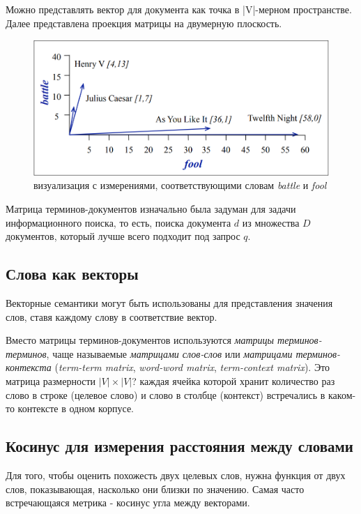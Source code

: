 \documentclass[a4paper,12pt,preview]{report} %
\begin{document}
	Можно представлять вектор для документа как точка в |V|-мерном пространстве. Далее представлена проекция матрицы на  двумерную плоскость.
	
	\begin{figure}[H]
		\centering\includegraphics[scale=0.6]{proje.PNG}
		\caption{визуализация с измерениями, соответствующими словам \textit{battle} и \textit{fool}}
		\label{fig:proje}
	\end{figure}
	
	Матрица терминов-документов изначально была задуман для задачи информационного поиска, то есть, поиска документа $d$ из множества $D$ документов, который лучше всего подходит под запрос $q$.
	
	
	\subsection{Слова как векторы}
	
	Векторные семантики могут быть использованы для представления значения слов, ставя каждому слову в соответствие вектор.
	
	Вместо матрицы терминов-документов используются \textit{матрицы терминов-терминов}, чаще называемые \textit{матрицами слов-слов} или \textit{матрицами терминов-контекста} (\textit{term-term matrix}, \textit{word-word matrix}, \textit{term-context matrix}).
	 Это матрица размерности $|V| \times |V|$? каждая ячейка которой хранит количество раз слово в строке (целевое слово) и слово в столбце (контекст) встречались в каком-то контексте в одном корпусе.
	 
	 \subsection{Косинус для измерения расстояния между словами}
	 
	Для того, чтобы оценить похожесть двух целевых слов, нужна функция от двух слов, показывающая, насколько они близки по значению. Самая часто встречающаяся метрика - косинус угла между векторами.
	
\end{document}
